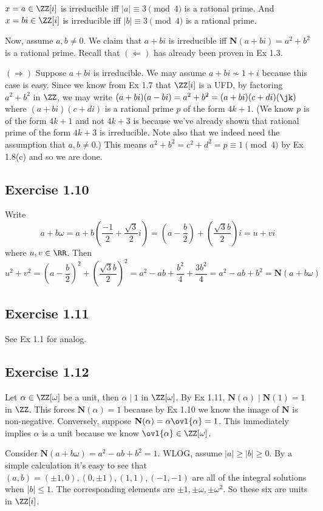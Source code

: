 \documentclass[../Chapter.tex]{subfiles}
\begin{document}
$x=a\in\ZZ[i]$ is irreducible iff $|a|\equiv 3\pmod{4}$ is a rational prime. And $x=bi\in\ZZ[i]$ is irreducible iff $|b|\equiv 3\pmod{4}$ is a rational prime.

Now, assume $a,b\neq 0$. We claim that $a+bi$ is irreducible iff $\mathbf{N}(a+bi)=a^2+b^2$ is a rational prime. Recall that $(\Leftarrow)$ has already been proven in Ex 1.3.

$(\Rightarrow)$ Suppose $a+bi$ is irreducible. We may assume $a+bi\not\sim 1+i$ because this case is easy. Since we know from Ex 1.7 that $\ZZ[i]$ is a UFD, by factoring $a^2+b^2$ in $\ZZ$, we may write $(a+bi)(a-bi)=a^2+b^2=(a+bi)(c+di)(\jk)$ where $(a+bi)(c+di)$ is a rational prime $p$ of the form $4k+1$. (We know $p$ is of the form $4k+1$ and not $4k+3$ is because we've already shown that rational prime of the form $4k+3$ is irreducible. Note also that we indeed need the assumption that $a,b\neq 0$.) This means $a^2+b^2=c^2+d^2=p\equiv1\pmod{4}$ by Ex 1.8(c) and so we are done.

\subsection*{Exercise 1.10}

Write $$a+b\omega=a+b\left(\frac{-1}{2}+\frac{\sqrt{3}}{2}i\right)=\left(a-\frac{b}{2}\right)+\left(\frac{\sqrt{3}b}{2}\right)i=u+vi$$ where $u,v\in\RR$. Then $$u^2+v^2=\left(a-\frac{b}{2}\right)^2+\left(\frac{\sqrt{3}b}{2}\right)^2=a^2-ab+\frac{b^2}{4}+\frac{3b^2}{4}=a^2-ab+b^2=\mathbf{N}(a+b\omega)$$

\subsection*{Exercise 1.11}

See Ex 1.1 for analog.

\subsection*{Exercise 1.12}

Let $\alpha\in\ZZ[\omega]$ be a unit, then $\alpha\mid 1$ in $\ZZ[\omega]$. By Ex 1.11, $\mathbf{N}(\alpha)\mid \mathbf{N}(1)=1$ in $\ZZ$. This forces $\mathbf{N}(\alpha)=1$ because by Ex 1.10 we know the image of $\mathbf{N}$ is non-negative. Conversely, suppose $\mathbf{N}(\alpha)=\alpha\ovl{\alpha}=1$. This immediately implies $\alpha$ is a unit because we know $\ovl{\alpha}\in\ZZ[\omega]$.

Consider $\mathbf{N}(a+b\omega)=a^2-ab+b^2=1$. WLOG, assume $|a|\geq|b|\geq0$. By a simple calculation it's easy to see that $(a,b)=(\pm1,0),(0,\pm1),(1,1),(-1,-1)$ are all of the integral solutions when $|b|\leq1$. The corresponding elements are $\pm1,\pm\omega,\pm\omega^2$. So these six are units in $\ZZ[i]$.
\end{document}
